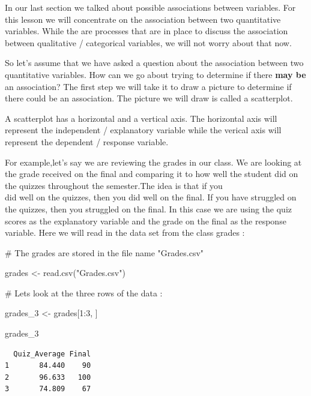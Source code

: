 \documentclass[
  letterpaper,
  DIV=11,
  numbers=noendperiod]{scrreprt}
\newenvironment{Shaded}{\begin{snugshade}}{\end{snugshade}}
\newcommand{\CommentTok}[1]{\textcolor[rgb]{0.37,0.37,0.37}{#1}}
\newcommand{\DecValTok}[1]{\textcolor[rgb]{0.68,0.00,0.00}{#1}}
\newcommand{\FunctionTok}[1]{\textcolor[rgb]{0.28,0.35,0.67}{#1}}
\newcommand{\NormalTok}[1]{\textcolor[rgb]{0.00,0.23,0.31}{#1}}
\newcommand{\OtherTok}[1]{\textcolor[rgb]{0.00,0.23,0.31}{#1}}
\newcommand{\SpecialCharTok}[1]{\textcolor[rgb]{0.37,0.37,0.37}{#1}}
\newcommand{\StringTok}[1]{\textcolor[rgb]{0.13,0.47,0.30}{#1}}
\begin{document}

In our last section we talked about possible associations between
variables. For this lesson we will concentrate on the association
between two quantitative variables. While the are processes that are in
place to discuss the association between qualitative / categorical
variables, we will not worry about that now.

So let's assume that we have asked a question about the association
between two quantitative variables. How can we go about trying to
determine if there \textbf{may be} an association? The first step we
will take it to draw a picture to determine if there could be an
association. The picture we will draw is called a scatterplot.

A scatterplot has a horizontal and a vertical axis. The horizontal axis
will represent the independent / explanatory variable while the verical
axis will represent the dependent / response variable.

For example,let's say we are reviewing the grades in our class. We are
looking at the grade received on the final and comparing it to how well
the student did on the quizzes throughout the semester.The idea is that
if you\\
did well on the quizzes, then you did well on the final. If you have
struggled on the quizzes, then you struggled on the final. In this case
we are using the quiz scores as the explanatory variable and the grade
on the final as the response variable. Here we will read in the data set
from the class grades :

\begin{Shaded}
\begin{Highlighting}[]
\CommentTok{\# The grades are stored in the file name "Grades.csv"}

\NormalTok{grades }\OtherTok{\textless{}{-}} \FunctionTok{read.csv}\NormalTok{(}\StringTok{"Grades.csv"}\NormalTok{)}

\CommentTok{\# Let\textquotesingle{}s look at the three rows of the data :}

\NormalTok{grades\_3 }\OtherTok{\textless{}{-}}\NormalTok{ grades[}\DecValTok{1}\SpecialCharTok{:}\DecValTok{3}\NormalTok{, ]}

\NormalTok{grades\_3}
\end{Highlighting}
\end{Shaded}

\begin{verbatim}
  Quiz_Average Final
1       84.440    90
2       96.633   100
3       74.809    67
\end{verbatim}
\end{document}
